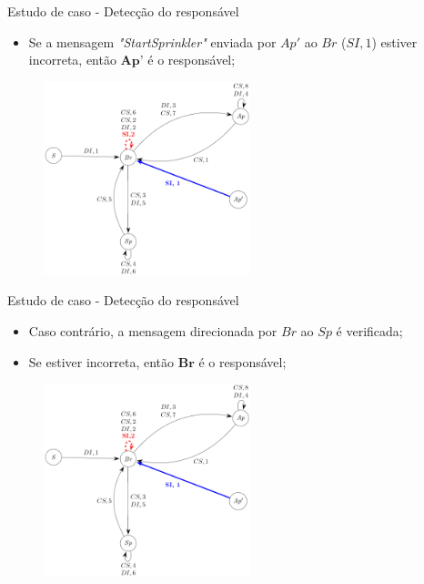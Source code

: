 \documentclass[12pt,xcolor={usenames,dvipsnames}]{beamer}
\begin{document}
\begin{frame}{Estudo de caso - Detecção do responsável}
\begin{itemize}
	\item Se a mensagem \textit{"StartSprinkler"} enviada por $Ap'$ ao $Br$ ($SI, 1$) estiver incorreta, então $\textbf{Ap'}$ é o responsável;  
\end{itemize}
\begin{figure}[ht]
	\centering
	\includegraphics[width=6cm]{./figuras/grafo_final.png}
\end{figure}
\end{frame}

\begin{frame}{Estudo de caso - Detecção do responsável}
\begin{itemize}
	\item Caso contrário, a mensagem direcionada por $Br$ ao $Sp$ é verificada; 
	\item Se estiver incorreta, então $\textbf{Br}$ é o responsável;
\end{itemize}
\begin{figure}[ht]
	\centering
	\includegraphics[width=6cm]{./figuras/grafo_final.png}
\end{figure}
\end{frame}
\end{document}
